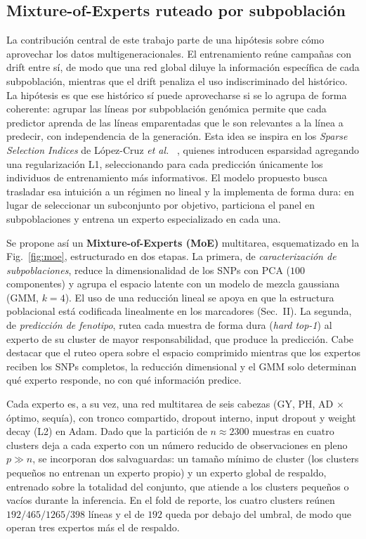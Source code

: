 \documentclass[conference]{IEEEtran}
\begin{document}
\subsection{Mixture-of-Experts ruteado por subpoblación}
La contribución central de este trabajo parte de una hipótesis sobre cómo aprovechar los datos multigeneracionales. El entrenamiento reúne campañas con drift entre sí, de modo que una red global diluye la información específica de cada subpoblación, mientras que el drift penaliza el uso indiscriminado del histórico. La hipótesis es que ese histórico sí puede aprovecharse si se lo agrupa de forma coherente: agrupar las líneas por subpoblación genómica permite que cada predictor aprenda de las líneas emparentadas que le son relevantes a la línea a predecir, con independencia de la generación. Esta idea se inspira en los \textit{Sparse Selection Indices} de López-Cruz \textit{et al.}\ \cite{lopezcruz2021} , quienes introducen esparsidad agregando una regularización L1, seleccionando para cada predicción únicamente los individuos de entrenamiento más informativos. El modelo propuesto busca trasladar esa intuición a un régimen no lineal y la implementa de forma dura: en lugar de seleccionar un subconjunto por objetivo, particiona el panel en subpoblaciones y entrena un experto especializado en cada una.

Se propone así un \textbf{Mixture-of-Experts (MoE)} multitarea, esquematizado en la Fig.~\ref{fig:moe}, estructurado en dos etapas. La primera, de \emph{caracterización de subpoblaciones}, reduce la dimensionalidad de los SNPs con PCA ($100$ componentes) y agrupa el espacio latente con un modelo de mezcla gaussiana (GMM, $k=4$). El uso de una reducción lineal se apoya en que la estructura poblacional está codificada linealmente en los marcadores (Sec.~II). La segunda, de \emph{predicción de fenotipo}, rutea cada muestra de forma dura (\textit{hard top-1}) al experto de su cluster de mayor responsabilidad, que produce la predicción. Cabe destacar que el ruteo opera sobre el espacio comprimido mientras que los expertos reciben los SNPs completos, la reducción dimensional  y el GMM solo determinan qué experto responde, no con qué información predice.

Cada experto es, a su vez, una red multitarea de seis cabezas (GY, PH, AD $\times$ óptimo, sequía), con tronco compartido, dropout interno, input dropout y weight decay (L2) en Adam.  Dado que la partición de $n\approx2300$ muestras en cuatro clusters deja a cada experto con un número reducido de observaciones en pleno $p\gg n$, se incorporan dos salvaguardas: un tamaño mínimo de cluster (los clusters pequeños no entrenan un experto propio) y un experto global de respaldo, entrenado sobre la totalidad del conjunto, que atiende a los clusters pequeños o vacíos durante la inferencia. En el fold de reporte, los cuatro clusters reúnen $192/465/1265/398$ líneas y el de $192$ queda por debajo del umbral, de modo que operan tres expertos más el de respaldo.
\end{document}
